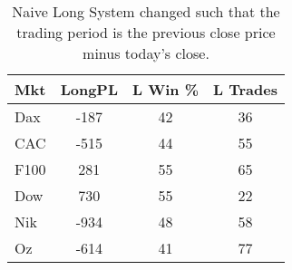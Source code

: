\begin{table}[ht]
\centering
\caption[Naive Long System - Close to Close]{Naive Long System changed such that the trading period is the previous close price minus today's close.} 
\label{tab:hammer_aroon_results}
\begin{tabular}{lccc}
  \toprule Mkt & LongPL & L Win \% & L Trades \\ 
  \midrule Dax & -187 & 42 & 36 \\ 
  CAC & -515 & 44 & 55 \\ 
  F100 & 281 & 55 & 65 \\ 
  Dow & 730 & 55 & 22 \\ 
  Nik & -934 & 48 & 58 \\ 
  Oz & -614 & 41 & 77 \\ 
   \bottomrule \end{tabular}
\end{table}
